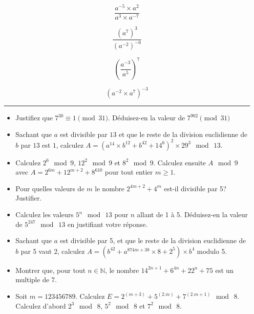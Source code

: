 \documentclass[a4paper,12pt]{article}
\theoremstyle{theorem}
\theoremstyle{definition}
\begin{document}
$$\displaystyle\frac{a^{-5}\times a^2}{a^3\times a^{-7}}$$

$$\displaystyle\frac{\left(a^7\right)^3}{\left(a^{-2}\right)^{-6}}$$

$$\displaystyle\left(\frac{a^{-3}}{a^5}\right)^7$$

$$\left(a^{-2}\times a^7\right)^{-3}$$






\vspace{.5cm}

\hrule
\vspace{.5cm}

\begin{itemize}

\item Justifiez que $7^{30} \equiv 1 \pmod{31}$. Déduisez-en la valeur de
$7^{902} \pmod{31}$



\item Sachant que $a$ est divisible par $13$ et que le reste de la division euclidienne de $b$ par $13$ est $1$, calculez $A=(a^{14}\times b^{12} + b^{42}+14^6)^2\times29^3 \mod\ 13$. 



\item Calculez $2^6\mod 9$, $12^2\mod9$ et $8^2\mod9$. Calculez ensuite $A\mod9$ avec
$A=2^{6m}+12^{m+2}+8^{610}$
pour tout entier $m\geq1$.



\item Pour quelles valeurs de $m$ le nombre $2^{4m+2}+4^{m}$ est-il divisible par 5? Justifier.


\item Calculez les valeurs
$5^n \mod\ 13$ pour $n$ allant de 1 à 5. Déduisez-en la valeur de
$5^{247} \mod\ 13$ en justifiant votre réponse.


\item Sachant que $a$ est divisible par 5, et que le reste de la division euclidienne de $b$ par 5 vaut 2, calculez $A=(b^{42}+a^{874 m +38}\times 8 + 2^5)\times b^4$ modulo 5.


\item Montrer que, pour tout $n\in{\mathbb N}$, le nombre $14^{2n+1}+6^{4n}+22^{n}+75$ est un multiple de 7.



\item Soit $m = 123456789$. Calculez $E = 2^{(m+3)} + 5^{(2.m)} + 7^{(2.m+1)} \mod\ 8$. Calculez d'abord $2^3\mod\ 8$, $5^2\mod\ 8$ et $7^2\mod\ 8$.



\end{itemize}
\end{document}
